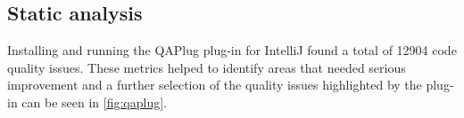 \subsection{Static analysis}
Installing and running the QAPlug plug-in for IntelliJ found a total of \num{12904} code quality issues. These metrics helped to identify areas that needed serious improvement and a further selection of the quality issues highlighted by the plug-in can be seen in \cref{fig:qaplug}. 

